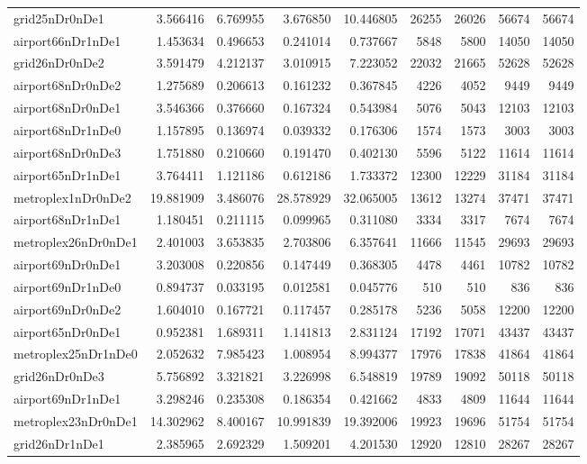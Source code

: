 \begin{longtable}{|l|r|r|r|r|r|r|r|r|}
grid25nDr0nDe1 & 3.566416 & 6.769955 & 3.676850 & 10.446805 & 26255 & 26026 & 56674 & 56674 \\
airport66nDr1nDe1 & 1.453634 & 0.496653 & 0.241014 & 0.737667 & 5848 & 5800 & 14050 & 14050 \\
grid26nDr0nDe2 & 3.591479 & 4.212137 & 3.010915 & 7.223052 & 22032 & 21665 & 52628 & 52628 \\
airport68nDr0nDe2 & 1.275689 & 0.206613 & 0.161232 & 0.367845 & 4226 & 4052 & 9449 & 9449 \\
airport68nDr0nDe1 & 3.546366 & 0.376660 & 0.167324 & 0.543984 & 5076 & 5043 & 12103 & 12103 \\
airport68nDr1nDe0 & 1.157895 & 0.136974 & 0.039332 & 0.176306 & 1574 & 1573 & 3003 & 3003 \\
airport68nDr0nDe3 & 1.751880 & 0.210660 & 0.191470 & 0.402130 & 5596 & 5122 & 11614 & 11614 \\
airport65nDr1nDe1 & 3.764411 & 1.121186 & 0.612186 & 1.733372 & 12300 & 12229 & 31184 & 31184 \\
metroplex1nDr0nDe2 & 19.881909 & 3.486076 & 28.578929 & 32.065005 & 13612 & 13274 & 37471 & 37471 \\
airport68nDr1nDe1 & 1.180451 & 0.211115 & 0.099965 & 0.311080 & 3334 & 3317 & 7674 & 7674 \\
metroplex26nDr0nDe1 & 2.401003 & 3.653835 & 2.703806 & 6.357641 & 11666 & 11545 & 29693 & 29693 \\
airport69nDr0nDe1 & 3.203008 & 0.220856 & 0.147449 & 0.368305 & 4478 & 4461 & 10782 & 10782 \\
airport69nDr1nDe0 & 0.894737 & 0.033195 & 0.012581 & 0.045776 & 510 & 510 & 836 & 836 \\
airport69nDr0nDe2 & 1.604010 & 0.167721 & 0.117457 & 0.285178 & 5236 & 5058 & 12200 & 12200 \\
airport65nDr0nDe1 & 0.952381 & 1.689311 & 1.141813 & 2.831124 & 17192 & 17071 & 43437 & 43437 \\
metroplex25nDr1nDe0 & 2.052632 & 7.985423 & 1.008954 & 8.994377 & 17976 & 17838 & 41864 & 41864 \\
grid26nDr0nDe3 & 5.756892 & 3.321821 & 3.226998 & 6.548819 & 19789 & 19092 & 50118 & 50118 \\
airport69nDr1nDe1 & 3.298246 & 0.235308 & 0.186354 & 0.421662 & 4833 & 4809 & 11644 & 11644 \\
metroplex23nDr0nDe1 & 14.302962 & 8.400167 & 10.991839 & 19.392006 & 19923 & 19696 & 51754 & 51754 \\
grid26nDr1nDe1 & 2.385965 & 2.692329 & 1.509201 & 4.201530 & 12920 & 12810 & 28267 & 28267 \\

\end{longtable}
